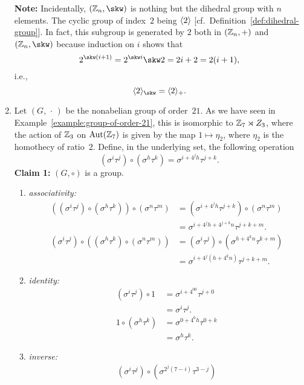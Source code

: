 \begin{xmpls}
\begin{enumerate}[\rm a)]
    \textbf{Note:} Incidentally, $(\Z_n,\skw)$ is nothing but the dihedral group with $n$ elements. The cyclic group of index~$2$ being $\langle2\rangle$ [cf.~Definition~\ref{def:dihedral-group}]. In fact, this subgroup is generated by $2$ both in $(\mathbb{Z}_n,+)$ and $(\Z_n,\skw)$ because induction on $i$ shows that
    $$
        2^{\skw(i+1)} = 2^{\skw i}\skw 2 = 2i + 2 = 2(i+1),
    $$
    i.e.,
    $$
        \gen2_\skw = \gen2_+.
    $$

    \item Let $(G,\,\cdot\,)$ be the nonabelian group of order~$21$. As we have seen in Example~\ref{example:group-of-order-21}, this is isomorphic to $\mathbb{Z}_7\rtimes Z_3$, where the action of $\mathbb{Z}_3$ on ${\rm Aut}(\mathbb{Z}_7)$ is given by the map $1\mapsto\eta_2$, where $\eta_2$ is the homothecy of ratio~$2$. Define, in the underlying set, the following operation
    $$
        (\sigma^i\tau^j)\circ(\sigma^h\tau^k)
            = \sigma^{i+4^jh}\tau^{j+k}.
    $$
    \textbf{Claim 1:} $(G,\circ)$ is a group.
    \begin{enumerate}[-]
        \item \textit{associativity:}
            \begin{align*}
                ((\sigma^i\tau^j)\circ(\sigma^h\tau^k))
                        \circ(\sigma^n\tau^m)
                    &= (\sigma^{i+4^jh}\tau^{j+k})\circ(\sigma^n\tau^m)\\
                    &= \sigma^{i+4^jh+4^{j+k}n}\tau^{j+k+m}.\\
                (\sigma^i\tau^j)\circ((\sigma^h\tau^k)
                        \circ(\sigma^n\tau^m))
                    &= (\sigma^i\tau^j)\circ(\sigma^{h+4^kn}\tau^{k+m})\\
                    &= \sigma^{i+4^j(h+4^kn)}\tau^{j+k+m}.
            \end{align*}
        \item \textit{identity:}
            \begin{align*}
                (\sigma^i\tau^j)\circ1 &= \sigma^{i+4^00}\tau^{j+0}\\
                    &= \sigma^i\tau^j.\\
                1\circ(\sigma^h\tau^k) &= \sigma^{0+4^0h}\tau^{0+k}\\
                    &= \sigma^h\tau^k.
            \end{align*}
        \item \textit{inverse:}
            \begin{align*}
                (\sigma^i\tau^j)\circ(\sigma^{2^j(7-i)}\tau^{3-j})

\end{align*}
\end{enumerate}
\end{enumerate}
\end{xmpls}
